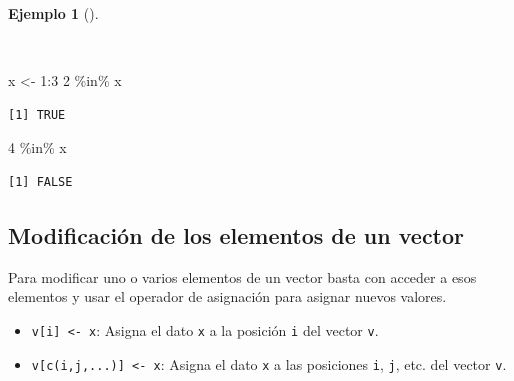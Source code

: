 \documentclass[
  a4paper,
]{scrreport}
\newenvironment{Shaded}{\begin{snugshade}}{\end{snugshade}}
\newcommand{\DecValTok}[1]{\textcolor[rgb]{0.68,0.00,0.00}{#1}}
\newcommand{\NormalTok}[1]{\textcolor[rgb]{0.00,0.23,0.31}{#1}}
\newcommand{\OtherTok}[1]{\textcolor[rgb]{0.00,0.23,0.31}{#1}}
\newcommand{\SpecialCharTok}[1]{\textcolor[rgb]{0.37,0.37,0.37}{#1}}
\providecommand{\tightlist}{%
  \setlength{\itemsep}{0pt}\setlength{\parskip}{0pt}}\usepackage{longtable,booktabs,array}
\theoremstyle{definition}
\theoremstyle{definition}
\newtheorem{example}{Ejemplo}[chapter]
\theoremstyle{remark}
\begin{document}
\begin{example}[]\protect\hypertarget{exm-pertenencia-vector}{}\label{exm-pertenencia-vector}

~

\begin{Shaded}
\begin{Highlighting}[]
\NormalTok{x }\OtherTok{\textless{}{-}} \DecValTok{1}\SpecialCharTok{:}\DecValTok{3}
\DecValTok{2} \SpecialCharTok{\%in\%}\NormalTok{ x}
\end{Highlighting}
\end{Shaded}

\begin{verbatim}
[1] TRUE
\end{verbatim}

\begin{Shaded}
\begin{Highlighting}[]
\DecValTok{4} \SpecialCharTok{\%in\%}\NormalTok{ x}
\end{Highlighting}
\end{Shaded}

\begin{verbatim}
[1] FALSE
\end{verbatim}

\end{example}

\hypertarget{modificaciuxf3n-de-los-elementos-de-un-vector}{%
\subsection{Modificación de los elementos de un
vector}\label{modificaciuxf3n-de-los-elementos-de-un-vector}}

Para modificar uno o varios elementos de un vector basta con acceder a
esos elementos y usar el operador de asignación para asignar nuevos
valores.

\begin{itemize}
\tightlist
\item
  \texttt{v{[}i{]}\ \textless{}-\ x}: Asigna el dato \texttt{x} a la
  posición \texttt{i} del vector \texttt{v}.
\item
  \texttt{v{[}c(i,j,...){]}\ \textless{}-\ x}: Asigna el dato \texttt{x}
  a las posiciones \texttt{i}, \texttt{j}, etc. del vector \texttt{v}.
\end{itemize}
\end{document}

